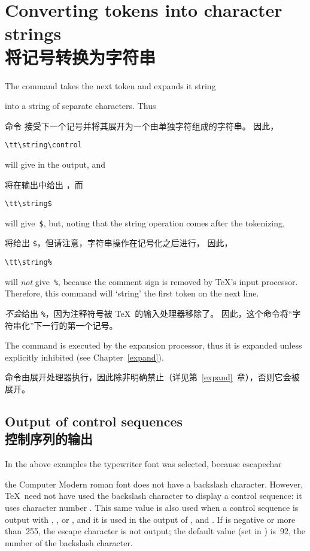 \section{Converting tokens into character strings\\将记号转换为字符串}

The command  takes the next token and expands it
\cstoidx string\par
into a string of separate characters. Thus

命令  接受下一个记号并将其展开为一个由单独字符组成的字符串。
因此，
\begin{verbatim}
\tt\string\control
\end{verbatim}
will give  in the
output, and

将在输出中给出 ，而
\begin{verbatim}
\tt\string$
\end{verbatim}
will give~\verb-$-, but, noting that the string 
operation comes after the tokenizing,

将给出 \verb-$-，但请注意，字符串操作在记号化之后进行，
因此，
\begin{verbatim}
\tt\string%
\end{verbatim}
will {\em not\/} give~\verb$%$,
because the comment
sign is removed by \TeX's input processor.
Therefore, this command will `string' the first token on the next line.

{\em 不会}给出 \verb$%$，因为注释符号被 \TeX\ 的输入处理器移除了。
因此，这个命令将“字符串化”下一行的第一个记号。

The  command is executed by the expansion processor, thus
it is expanded unless explicitly inhibited (see Chapter~\ref{expand}).

 命令由展开处理器执行，因此除非明确禁止（详见第~\ref{expand}~章），否则它会被展开。


\subsection{Output of control sequences\\控制序列的输出}

In the above examples the typewriter font was selected, because
\cstoidx escapechar\par
the Computer Modern roman font does not have a backslash character.
\awp
However,
\TeX\ need not have used the backslash character to display
a control sequence: it uses character number .
This same value is also used when a control sequence is
output with , , or ,
and it is used in the output of ,  and .
If  is negative or more than~255,
the escape character is not
output; the default value (set in \IniTeX) is~92, the number
of the backslash character.

